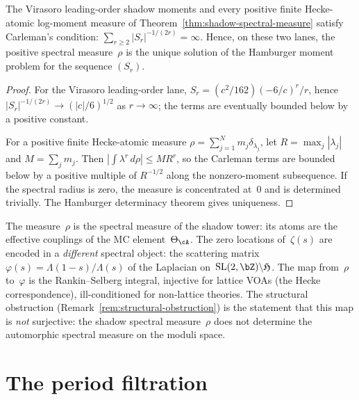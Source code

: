 \begin{proposition}
\label{prop:carleman-virasoro}
\ClaimStatusProvedHere
The Virasoro leading-order shadow moments and every positive finite
Hecke-atomic log-moment measure of Theorem~\ref{thm:shadow-spectral-measure}
satisfy Carleman's condition:
$\sum_{r\ge2} |S_r|^{-1/(2r)} = \infty$. Hence, on these two lanes,
the positive spectral measure~$\rho$ is the unique solution of the
Hamburger moment problem for the sequence $(S_r)$.
\end{proposition}

\begin{proof}
For the Virasoro leading-order lane,
$S_r=(c^2/162)(-6/c)^r/r$, hence
$|S_r|^{-1/(2r)} \to (|c|/6)^{1/2}$ as $r \to \infty$; the terms are
eventually bounded below by a positive constant.

For a positive finite Hecke-atomic measure
$\rho=\sum_{j=1}^N m_j\delta_{\lambda_j}$, let
$R=\max_j|\lambda_j|$ and $M=\sum_jm_j$. Then
$\left|\int\lambda^r\,d\rho\right|\le MR^r$, so the Carleman terms are
bounded below by a positive multiple of $R^{-1/2}$ along the
nonzero-moment subsequence. If the spectral radius is zero, the measure
is concentrated at~$0$ and is determined trivially. The Hamburger
determinacy theorem gives uniqueness.
\end{proof}

\begin{remark}
\label{rem:moment-problem-vs-zero-location}
The measure~$\rho$ is the spectral measure of the shadow tower:
its atoms are the effective couplings of the MC
element~$\Theta_\cA$. The zero locations of~$\zeta(s)$ are
encoded in a \emph{different} spectral object: the scattering
matrix $\varphi(s) = \Lambda(1{-}s)/\Lambda(s)$ of the Laplacian
on~$\mathrm{SL}(2,\bZ)\backslash\mathfrak{H}$. The map from~$\rho$
to~$\varphi$ is the Rankin--Selberg integral, injective for
lattice VOAs (the Hecke correspondence), ill-conditioned for
non-lattice theories. The structural obstruction
(Remark~\ref{rem:structural-obstruction}) is the statement that
this map is \emph{not} surjective: the shadow spectral
measure~$\rho$ does not determine the automorphic spectral
measure on the moduli space.
\end{remark}

\section{The period filtration}\label{sec:period-filtration-main}

